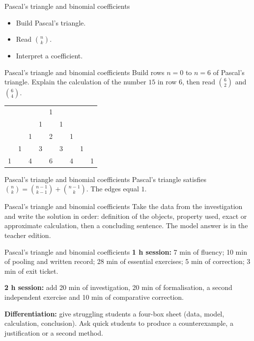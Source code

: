 \documentclass[aspectratio=169,10pt]{beamer}
\begin{document}
\begin{frame}{Pascal's triangle and binomial coefficients}
\begin{itemize}
\item Build Pascal's triangle.
\item Read \(\binom nk\).
\item Interpret a coefficient.

\end{itemize}
\end{frame}
\begin{frame}{Pascal's triangle and binomial coefficients}
Build rows \(n=0\) to \(n=6\) of Pascal's triangle. Explain the calculation of the number \(15\) in row \(6\), then read \(\binom62\) and \(\binom64\).
 \begin{center}\begin{tabular}{lllllllll}
 &  &  &  & 1 &  &  &  &  \\ 
 &  &  & 1 &  & 1 &  &  &  \\ 
 &  & 1 &  & 2 &  & 1 &  &  \\ 
 & 1 &  & 3 &  & 3 &  & 1 &  \\ 
1 &  & 4 &  & 6 &  & 4 &  & 1 \\ 
\end{tabular}\end{center}
\end{frame}
\begin{frame}{Pascal's triangle and binomial coefficients}
Pascal's triangle satisfies \(\binom nk=\binom{n-1}{k-1}+\binom{n-1}{k}\). The edges equal \(1\).
\end{frame}
\begin{frame}{Pascal's triangle and binomial coefficients}
Take the data from the investigation and write the solution in order: definition of the objects, property used, exact or approximate calculation, then a concluding sentence. The model answer is in the teacher edition.
\end{frame}
\begin{frame}{Pascal's triangle and binomial coefficients}
\textbf{1 h session:} 7 min of fluency; 10 min of pooling and written record; 28 min of essential exercises; 5 min of correction; 3 min of exit ticket.

\textbf{2 h session:} add 20 min of investigation, 20 min of formalisation, a second independent exercise and 10 min of comparative correction.

\textbf{Differentiation:} give struggling students a four-box sheet (data, model, calculation, conclusion). Ask quick students to produce a counterexample, a justification or a second method.
\end{frame}
\end{document}
